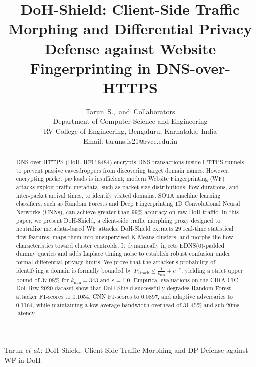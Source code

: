 \documentclass[10pt,journal,compsoc,twocolumn]{IEEEtran}
\begin{document}
\title{DoH-Shield: Client-Side Traffic Morphing and Differential Privacy Defense against Website Fingerprinting in DNS-over-HTTPS}

\author{Tarun~S.,~and~Collaborators\\
Department of Computer Science and Engineering\\
RV College of Engineering, Bengaluru, Karnataka, India\\
Email: taruns.is21@rvce.edu.in}

%
{Tarun \MakeLowercase{\textit{et al.}}: DoH-Shield: Client-Side Traffic Morphing and DP Defense against WF in DoH}

\maketitle

\begin{abstract}
DNS-over-HTTPS (DoH, RFC 8484) encrypts DNS transactions inside HTTPS tunnels to prevent passive eavesdroppers from discovering target domain names. However, encrypting packet payloads is insufficient; modern Website Fingerprinting (WF) attacks exploit traffic metadata, such as packet size distributions, flow durations, and inter-packet arrival times, to identify visited domains. SOTA machine learning classifiers, such as Random Forests and Deep Fingerprinting 1D Convolutional Neural Networks (CNNs), can achieve greater than 99\% accuracy on raw DoH traffic. In this paper, we present DoH-Shield, a client-side traffic morphing proxy designed to neutralize metadata-based WF attacks. DoH-Shield extracts 29 real-time statistical flow features, maps them into unsupervised K-Means clusters, and morphs the flow characteristics toward cluster centroids. It dynamically injects EDNS(0)-padded dummy queries and adds Laplace timing noise to establish robust confusion under formal differential privacy limits. We prove that the attacker's probability of identifying a domain is formally bounded by $P_{\text{attack}} \le \frac{1}{k_{\min}} + e^{-\varepsilon}$, yielding a strict upper bound of 37.08\% for $k_{\min} = 343$ and $\varepsilon = 1.0$. Empirical evaluations on the CIRA-CIC-DoHBrw-2020 dataset show that DoH-Shield successfully degrades Random Forest attacker F1-scores to 0.1054, CNN F1-scores to 0.0897, and adaptive adversaries to 0.1164, while maintaining a low average bandwidth overhead of 31.45\% and sub-20ms latency.
\end{abstract}
\end{document}
